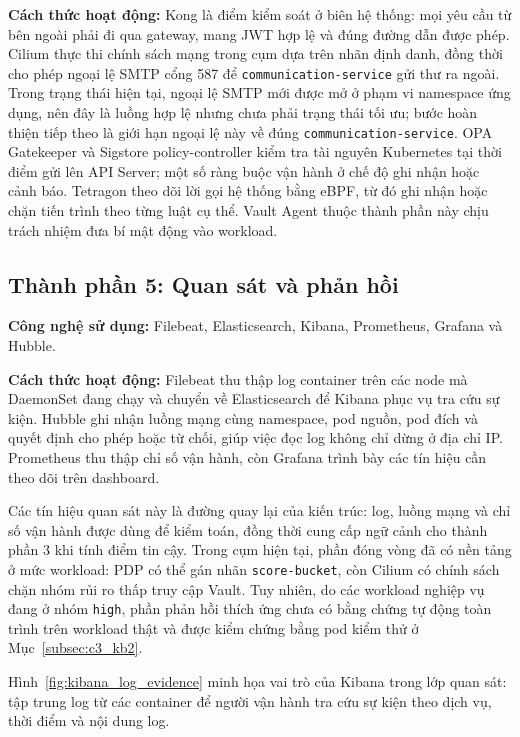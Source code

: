 \textbf{Cách thức hoạt động:} Kong là điểm kiểm soát ở biên hệ thống: mọi yêu cầu từ bên ngoài phải đi qua gateway, mang JWT hợp lệ và đúng đường dẫn được phép. Cilium thực thi chính sách mạng trong cụm dựa trên nhãn định danh, đồng thời cho phép ngoại lệ SMTP cổng 587 để \texttt{communication-service} gửi thư ra ngoài. Trong trạng thái hiện tại, ngoại lệ SMTP mới được mở ở phạm vi namespace ứng dụng, nên đây là luồng hợp lệ nhưng chưa phải trạng thái tối ưu; bước hoàn thiện tiếp theo là giới hạn ngoại lệ này về đúng \texttt{communication-service}. OPA Gatekeeper và Sigstore policy-controller kiểm tra tài nguyên Kubernetes tại thời điểm gửi lên API Server; một số ràng buộc vận hành ở chế độ ghi nhận hoặc cảnh báo. Tetragon theo dõi lời gọi hệ thống bằng eBPF, từ đó ghi nhận hoặc chặn tiến trình theo từng luật cụ thể. Vault Agent thuộc thành phần này chịu trách nhiệm đưa bí mật động vào workload.

\subsection{Thành phần 5: Quan sát và phản hồi}

\textbf{Công nghệ sử dụng:} Filebeat, Elasticsearch, Kibana, Prometheus, Grafana và Hubble.

\textbf{Cách thức hoạt động:} Filebeat thu thập log container trên các node mà DaemonSet đang chạy và chuyển về Elasticsearch để Kibana phục vụ tra cứu sự kiện. Hubble ghi nhận luồng mạng cùng namespace, pod nguồn, pod đích và quyết định cho phép hoặc từ chối, giúp việc đọc log không chỉ dừng ở địa chỉ IP. Prometheus thu thập chỉ số vận hành, còn Grafana trình bày các tín hiệu cần theo dõi trên dashboard.

Các tín hiệu quan sát này là đường quay lại của kiến trúc: log, luồng mạng và chỉ số vận hành được dùng để kiểm toán, đồng thời cung cấp ngữ cảnh cho thành phần 3 khi tính điểm tin cậy. Trong cụm hiện tại, phần đóng vòng đã có nền tảng ở mức workload: PDP có thể gán nhãn \texttt{score-bucket}, còn Cilium có chính sách chặn nhóm rủi ro thấp truy cập Vault. Tuy nhiên, do các workload nghiệp vụ đang ở nhóm \texttt{high}, phần phản hồi thích ứng chưa có bằng chứng tự động toàn trình trên workload thật và được kiểm chứng bằng pod kiểm thử ở Mục~\ref{subsec:c3_kb2}.

Hình~\ref{fig:kibana_log_evidence} minh họa vai trò của Kibana trong lớp quan sát: tập trung log từ các container để người vận hành tra cứu sự kiện theo dịch vụ, thời điểm và nội dung log.


